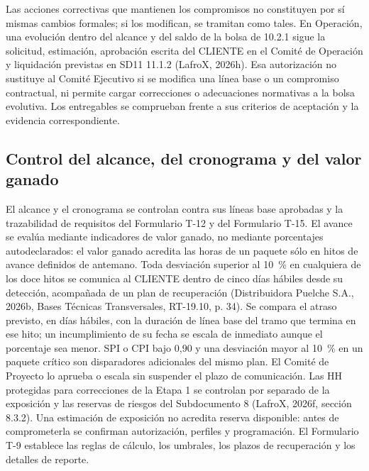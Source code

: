 Las acciones correctivas que mantienen los compromisos no constituyen por sí mismas cambios formales; si los modifican, se tramitan como tales. En Operación, una evolución dentro del alcance y del saldo de la bolsa de 10.2.1 sigue la solicitud, estimación, aprobación escrita del CLIENTE en el Comité de Operación y liquidación previstas en SD11 11.1.2 (LafroX, 2026h). Esa autorización no sustituye al Comité Ejecutivo si se modifica una línea base o un compromiso contractual, ni permite cargar correcciones o adecuaciones normativas a la bolsa evolutiva. Los entregables se comprueban frente a sus criterios de aceptación y la evidencia correspondiente.

\subsection{Control del alcance, del cronograma y del valor ganado}

El alcance y el cronograma se controlan contra sus líneas base aprobadas y la trazabilidad de requisitos del Formulario T-12 y del Formulario T-15. El avance se evalúa mediante indicadores de valor ganado, no mediante porcentajes autodeclarados: el valor ganado acredita las horas de un paquete sólo en hitos de avance definidos de antemano. Toda desviación superior al 10~\% en cualquiera de los doce hitos se comunica al CLIENTE dentro de cinco días hábiles desde su detección, acompañada de un plan de recuperación (Distribuidora Puelche S.A., 2026b, Bases Técnicas Transversales, RT-19.10, p. 34). Se compara el atraso previsto, en días hábiles, con la duración de línea base del tramo que termina en ese hito; un incumplimiento de su fecha se escala de inmediato aunque el porcentaje sea menor. SPI o CPI bajo 0,90 y una desviación mayor al 10~\% en un paquete crítico son disparadores adicionales del mismo plan. El Comité de Proyecto lo aprueba o escala sin suspender el plazo de comunicación. Las HH protegidas para correcciones de la Etapa 1 se controlan por separado de la exposición y las reservas de riesgos del Subdocumento 8 (LafroX, 2026f, sección 8.3.2). Una estimación de exposición no acredita reserva disponible: antes de comprometerla se confirman autorización, perfiles y programación. El Formulario T-9 establece las reglas de cálculo, los umbrales, los plazos de recuperación y los detalles de reporte.

